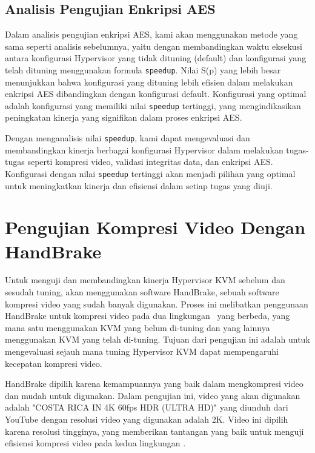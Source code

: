 \subsection{Analisis Pengujian Enkripsi AES}
Dalam analisis pengujian enkripsi AES, kami akan menggunakan metode yang sama seperti analisis sebelumnya, yaitu dengan membandingkan waktu eksekusi antara konfigurasi Hypervisor yang tidak dituning (default) dan konfigurasi yang telah dituning menggunakan formula \texttt{speedup}. Nilai S(p) yang lebih besar menunjukkan bahwa konfigurasi yang dituning lebih efisien dalam melakukan enkripsi AES dibandingkan dengan konfigurasi default. Konfigurasi yang optimal adalah konfigurasi yang memiliki nilai \texttt{speedup} tertinggi, yang mengindikasikan peningkatan kinerja yang signifikan dalam proses enkripsi AES.

\hfill

Dengan menganalisis nilai \texttt{speedup}, kami dapat mengevaluasi dan membandingkan kinerja berbagai konfigurasi Hypervisor dalam melakukan tugas-tugas seperti kompresi video, validasi integritas data, dan enkripsi AES. Konfigurasi dengan nilai \texttt{speedup} tertinggi akan menjadi pilihan yang optimal untuk meningkatkan kinerja dan efisiensi dalam setiap tugas yang diuji.

\iffalse
    \section{Pengujian Kompresi Video Dengan HandBrake}
    Untuk menguji dan membandingkan kinerja Hypervisor KVM sebelum dan sesudah tuning, {\saya} akan menggunakan software HandBrake, sebuah software kompresi video yang sudah banyak digunakan. Proses ini melibatkan penggunaan HandBrake untuk kompresi video pada dua lingkungan \vm\ yang berbeda, yang mana satu menggunakan KVM yang belum di-tuning dan yang lainnya menggunakan KVM yang telah di-tuning. Tujuan dari pengujian ini adalah untuk mengevaluasi sejauh mana tuning Hypervisor KVM dapat mempengaruhi kecepatan kompresi video.

    HandBrake dipilih karena kemampuannya yang baik dalam mengkompresi video dan mudah untuk digunakan\cite{Folgar2014eg}. Dalam pengujian ini, video yang akan digunakan adalah "COSTA RICA IN 4K 60fps HDR (ULTRA HD)" yang diunduh dari YouTube dengan resolusi video yang digunakan adalah 2K. Video ini dipilih karena resolusi tingginya, yang memberikan tantangan yang baik untuk menguji efisiensi kompresi video pada kedua lingkungan \vm.

